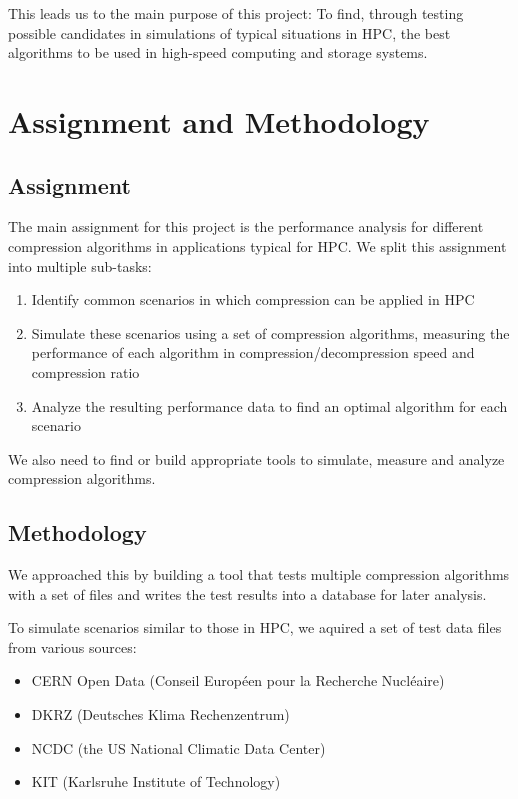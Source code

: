 \documentclass[
	12pt,
	a4paper,
	BCOR10mm,
	DIV14,
	listof=totoc,
	bibliography=totoc,
	headsepline
]{scrreprt}
\begin{document}
This leads us to the main purpose of this project: To find, through testing possible candidates in simulations of typical situations in HPC, the best algorithms to be used in high-speed computing and storage systems.


\chapter{Assignment and Methodology}
\label{Assignment and Methodology}
\section*{Assignment}
The main assignment for this project is the performance analysis for different compression algorithms in applications typical for HPC. We split this assignment into multiple sub-tasks:

\begin{enumerate}
\item Identify common scenarios in which compression can be applied in HPC
\item Simulate these scenarios using a set of compression algorithms, measuring the performance of each algorithm in compression/decompression speed and compression ratio
\item Analyze the resulting performance data to find an optimal algorithm for each scenario
\end{enumerate}

We also need to find or build appropriate tools to simulate, measure and analyze compression algorithms.


\section*{Methodology}
We approached this by building a tool that tests multiple compression algorithms with a set of files and writes the test results into a database for later analysis.

To simulate scenarios similar to those in HPC, we aquired a set of test data files from various sources:
\begin{itemize}
\item CERN Open Data (Conseil Européen pour la Recherche Nucléaire)
\item DKRZ (Deutsches Klima Rechenzentrum)
\item NCDC (the US National Climatic Data Center)
\item KIT (Karlsruhe Institute of Technology)
\end{itemize}
\end{document}
